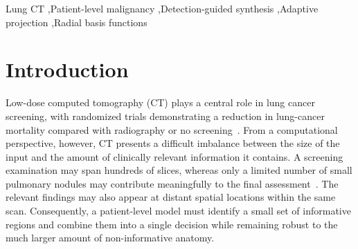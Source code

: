 \documentclass[preprint,12pt]{elsarticle}
\begin{document}
\begin{frontmatter}
\begin{abstract}
On LUNA16, using CPMNetv2 detections with threshold $0.50$ and top-$4$ candidates, the proposed Adaptive RBF representation with EfficientNetV2-S achieved a pooled AUC of $0.8149$ over 796 labeled scans in 10-fold cross-validation. It significantly outperformed MIP axial projection (AUC $0.6075$), MIP tri-view (AUC $0.6175$), central axial slice selection (AUC $0.6153$), detector-crop MIL attention (AUC $0.5410$), fixed/random control-point ablations, and a full-volume 3D ResNet18 baseline (AUC $0.5659$). Paired DeLong tests confirmed significant AUC improvements over all planned comparators after FDR correction. These results indicate that the proposed framework effectively addresses the sparse-evidence aggregation problem by selectively concentrating spatially distributed lesion information into a compact representation suitable for global patient-level classification, rather than benefiting merely from dimensionality reduction.
\end{abstract}

\begin{keyword}
Lung CT \sep Patient-level malignancy \sep Detection-guided synthesis \sep Adaptive projection \sep Radial basis functions
\end{keyword}

\end{frontmatter}

\section{Introduction}

Low-dose computed tomography (CT) plays a central role in lung cancer screening, with randomized trials demonstrating a reduction in lung-cancer mortality compared with radiography or no screening~\cite{nlst2011,nelson2020}. From a computational perspective, however, CT presents a difficult imbalance between the size of the input and the amount of clinically relevant information it contains. A screening examination may span hundreds of slices, whereas only a limited number of small pulmonary nodules may contribute meaningfully to the final assessment~\cite{armato2011lidc,setio2017luna16}. The relevant findings may also appear at distant spatial locations within the same scan. Consequently, a patient-level model must identify a small set of informative regions and combine them into a single decision while remaining robust to the much larger amount of non-informative anatomy.
\end{document}
